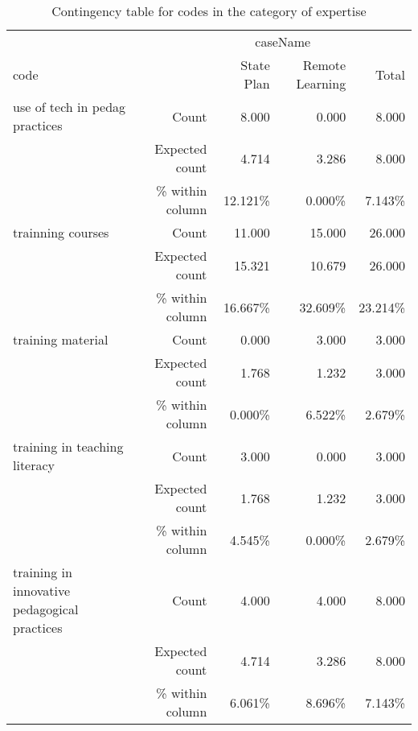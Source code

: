 \documentclass[6pt, oneside]{article}   	%
\begin{document}


\begin{table}[h]
	\centering
	\caption{Contingency table for codes in the category of expertise}
	\label{tab:contingencyTables}
	{
		\begin{tabular}{lrrrr}
			\toprule
			\multicolumn{1}{c}{} & \multicolumn{1}{c}{} & \multicolumn{2}{c}{caseName} & \multicolumn{1}{c}{} \\
			\cline{3-4}
			code &  & State Plan & Remote Learning & Total  \\
			\cmidrule[0.4pt]{1-5}
			use of tech in pedag practices & Count & 8.000 & 0.000 & 8.000  \\
			 & Expected count & 4.714 & 3.286 & 8.000  \\
			 &  \% within column & 12.121\% & 0.000\% & 7.143\%  \\
			trainning courses & Count & 11.000 & 15.000 & 26.000  \\
			 & Expected count & 15.321 & 10.679 & 26.000  \\
			 &  \% within column & 16.667\% & 32.609\% & 23.214\%  \\
			training material & Count & 0.000 & 3.000 & 3.000  \\
			 & Expected count & 1.768 & 1.232 & 3.000  \\
			 &  \% within column & 0.000\% & 6.522\% & 2.679\%  \\
			training in teaching literacy & Count & 3.000 & 0.000 & 3.000  \\
			 & Expected count & 1.768 & 1.232 & 3.000  \\
			 &  \% within column & 4.545\% & 0.000\% & 2.679\%  \\
			training in innovative pedagogical practices & Count & 4.000 & 4.000 & 8.000  \\
			 & Expected count & 4.714 & 3.286 & 8.000  \\
			 &  \% within column & 6.061\% & 8.696\% & 7.143\%  \\

\end{tabular}}
\end{table}
\end{document}
